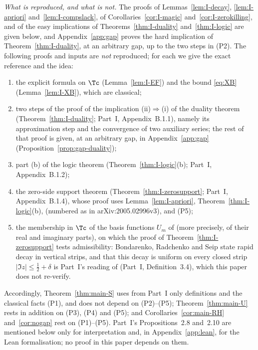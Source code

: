 \emph{What is reproduced, and what is not.} The proofs of Lemmas~\ref{lem:I-decay}, \ref{lem:I-apriori} and~\ref{lem:I-compslack}, of
Corollaries~\ref{cor:I-magic} and~\ref{cor:I-zerokilling}, and of the easy implications of Theorems~\ref{thm:I-duality} and~\ref{thm:I-logic}
are given below, and Appendix~\ref{app:gap} proves the hard implication of Theorem~\ref{thm:I-duality}, at an arbitrary gap, up to the two
steps in (P2). The following proofs and inputs are \emph{not} reproduced; for each we give the exact reference and the idea:
\begin{enumerate}[label=(P\arabic*),leftmargin=*]
\item the explicit formula on $\Tc$ (Lemma~\ref{lem:I-EF}) and the bound \eqref{eq:XB} (Lemma~\ref{lem:I-XB}), which are classical;
\item two steps of the proof of the implication (ii)$\Rightarrow$(i) of the duality theorem (Theorem~\ref{thm:I-duality}; Part~I,
Appendix~B.1.1), namely its approximation step and the convergence of two auxiliary series; the rest of that proof is given, at an arbitrary
gap, in Appendix~\ref{app:gap} (Proposition~\ref{prop:gap-duality});
\item part (b) of the logic theorem (Theorem~\ref{thm:I-logic}(b); Part~I, Appendix~B.1.2);
\item the zero-side support theorem (Theorem~\ref{thm:I-zerosupport}; Part~I, Appendix~B.1.4), whose proof uses Lemma~\ref{lem:I-apriori},
Theorem~\ref{thm:I-logic}(b), \cite[Theorem~1.1, \S\S4.2--4.3 and (3.12), (3.16), (3.17)]{BRS} (numbered as in arXiv:2005.02996v3),
\cite[Theorem~1 and \S6]{RV19} and (P5);
\item the membership in $\Tc$ of the basis functions $U_m$ of \cite[Theorem~1.1]{BRS} (more precisely, of their real and imaginary parts),
on which the proof of Theorem~\ref{thm:I-zerosupport} tests admissibility: Bondarenko, Radchenko and Seip state rapid decay in vertical
strips, and that this decay is uniform on every closed strip $|\Im z|\le\frac12+\delta$ is Part~I's reading of \cite[\S4.3]{BRS} (Part~I,
Definition~3.4), which this paper does not re-verify.
\end{enumerate}
Accordingly, Theorem~\ref{thm:main-S} uses from Part~I only definitions and the classical facts (P1), and does not depend on (P2)--(P5);
Theorem~\ref{thm:main-U} rests in addition on (P3), (P4) and (P5); and Corollaries~\ref{cor:main-RH} and~\ref{cor:nogap} rest on (P1)--(P5). Part~I's Propositions~2.8 and~2.10 are mentioned below only for
interpretation and, in Appendix~\ref{app:lean}, for the Lean formalisation; no proof in this paper depends on them.

